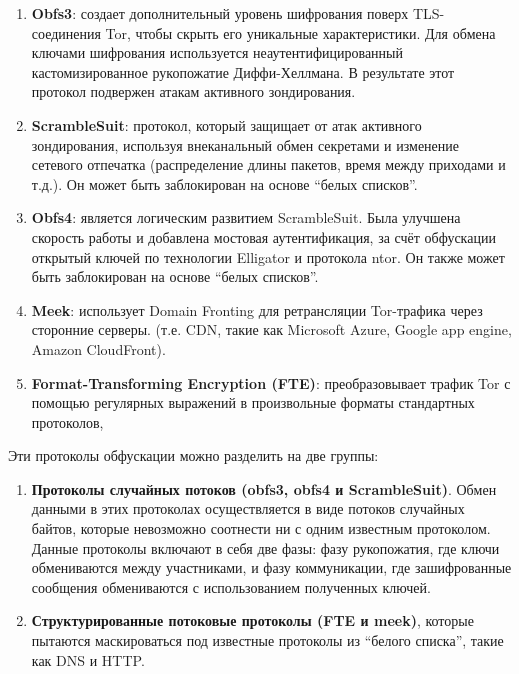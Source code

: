 \begin{enumerate}

    \item \textbf{Obfs3}: создает дополнительный уровень шифрования поверх TLS-соединения Tor, чтобы скрыть его уникальные характеристики.
    Для обмена ключами шифрования используется неаутентифицированный кастомизированное рукопожатие Диффи-Хеллмана.
    В результате этот протокол подвержен атакам активного зондирования.

    \item \textbf{ScrambleSuit}: протокол, который защищает от атак активного зондирования,
    используя внеканальный обмен секретами и изменение сетевого отпечатка
    (распределение длины пакетов, время между приходами и т.д.). Он может быть заблокирован на основе ``белых списков''.

    \item \textbf{Obfs4}: является логическим развитием ScrambleSuit.
    Была улучшена скорость работы и добавлена мостовая аутентификация,
    за счёт обфускации открытый ключей по технологии Elligator и протокола ntor.
    Он также может быть заблокирован на основе ``белых списков''.


    \item \textbf{Meek}: использует Domain Fronting для ретрансляции Tor-трафика через сторонние серверы.
    (т.е. CDN, такие как Microsoft Azure, Google app engine, Amazon CloudFront).

    \item \textbf{Format-Transforming Encryption (FTE)}:
    преобразовывает трафик Tor с помощью регулярных выражений в произвольные форматы стандартных протоколов,


\end{enumerate}

Эти протоколы обфускации можно разделить на две группы:

\begin{enumerate}

    \item \textbf{Протоколы случайных потоков (obfs3, obfs4 и ScrambleSuit)}.
    Обмен данными в этих протоколах осуществляется в виде потоков случайных байтов,
    которые невозможно соотнести ни с одним известным протоколом.
    Данные протоколы включают в себя две фазы: фазу рукопожатия, где ключи обмениваются между участниками,
    и фазу коммуникации, где зашифрованные сообщения обмениваются с использованием полученных ключей.

    \item \textbf{Структурированные потоковые протоколы (FTE и meek)},
    которые пытаются маскироваться под известные протоколы из ``белого списка'', такие как DNS и HTTP.

\end{enumerate}

